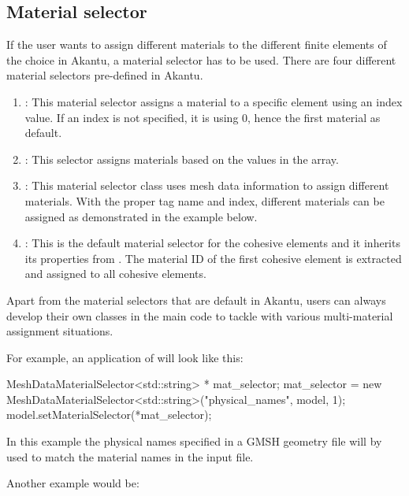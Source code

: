 \subsection{Material selector\label{sect:smm:materialselector}}

If the user wants to assign different materials to the different finite elements
of the choice in Akantu, a material selector has to be used. There are four
different material selectors pre-defined in Akantu.

\begin{enumerate}
\item {}: This material selector assigns a material to a
  specific element using an index value. If an index is not specified, it is
  using 0, hence the first material as default.
\item {}: This selector assigns materials based on
  the values in the  array.
\item {}: This material selector class uses mesh
  data information to assign different materials. With the proper tag name and
  index, different materials can be assigned as demonstrated in the example
  below.
\item {}: This is the default material
  selector for the cohesive elements and it inherits its properties from
  . The material ID of the first cohesive element
  is extracted and assigned to all cohesive elements.
\end{enumerate}

Apart from the material selectors that are default in Akantu, users can always
develop their own classes in the main code to tackle with various multi-material
assignment situations.

For example, an application of  will look like this:

\begin{cpp}
MeshDataMaterialSelector<std::string> * mat_selector;
mat_selector = new MeshDataMaterialSelector<std::string>("physical_names", model, 1);
model.setMaterialSelector(*mat_selector);
\end{cpp}

In this example the physical names specified in a GMSH geometry file will by
used to match the material names in the input file.

Another example would be:

